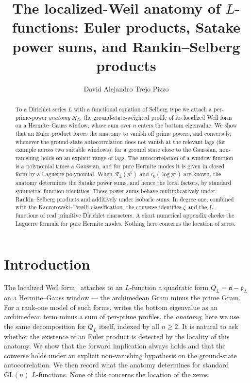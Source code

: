 \documentclass[11pt]{amsart}
\title[The localized-Weil anatomy of $L$-functions]{The localized-Weil anatomy of
$L$-functions: Euler products, Satake power sums, and Rankin--Selberg products}
\author{David Alejandro Trejo Pizzo}
\theoremstyle{definition}
\theoremstyle{remark}
\newcommand{\fa}{\mathfrak a}
\newcommand{\fp}{\mathfrak p}
\newcommand{\cR}{\mathcal R}
\newcommand{\GL}{\mathrm{GL}}
\begin{document}
\begin{abstract}
To a Dirichlet series $L$ with a functional equation of Selberg type we attach a
per-prime-power \emph{anatomy} $\cR_L$, the ground-state-weighted profile of its
localized Weil form on a Hermite--Gauss window, whose sum over $n$ enters the
bottom eigenvalue. We show that an Euler product forces the anatomy to vanish
off prime powers, and conversely, whenever the ground-state autocorrelation does
not vanish at the relevant lags (for example across two suitable windows); for a
ground state close to the Gaussian, non-vanishing holds on an explicit range of
lags. The autocorrelation of a window function is a polynomial times a Gaussian,
and for pure Hermite modes it is given in closed form by a Laguerre polynomial.
When $\cR_L(p^k)$ and $c_0(\log p^k)$ are known, the anatomy determines the
Satake power sums, and hence the local factors, by standard symmetric-function
identities. These power sums behave multiplicatively under Rankin--Selberg
products and additively under isobaric sums. In degree one, combined with the
Kaczorowski--Perelli classification, the converse identifies $\zeta$ and the
$L$-functions of real primitive Dirichlet characters. A short numerical appendix checks the Laguerre formula
for pure Hermite modes. Nothing here concerns the location of zeros.
\end{abstract}
\maketitle

\tableofcontents
\newpage

\section{Introduction}
The localized Weil form~\cite{RP7} attaches to an $L$-function a quadratic form
$Q_L=\fa-\fp_L$ on a Hermite--Gauss window --- the archimedean Gram minus the
prime Gram. For a rank-one model of such forms, \cite{RP9} writes the bottom
eigenvalue as an archimedean term minus a sum of per-prime profiles, the
\emph{anatomy}; here we use the same decomposition for $Q_L$ itself, indexed by
all $n\ge2$. It is natural to ask whether the existence of an Euler product is
detected by the locality of this anatomy. We show that the forward implication always holds and
that the converse holds under an explicit non-vanishing hypothesis on the
ground-state autocorrelation. We then record what the anatomy determines for
standard $\GL(n)$ $L$-functions. None of this concerns the location of the
zeros.
\end{document}
